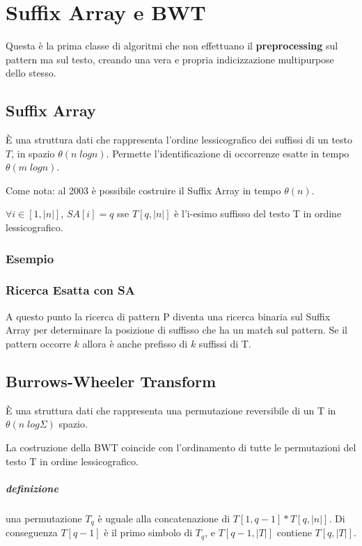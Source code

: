\chapter{Suffix Array e BWT}

Questa \`e la prima classe di algoritmi che non effettuano il \textbf{preprocessing} sul pattern ma sul testo, creando una vera e propria indicizzazione multipurpose dello stesso.

\section{Suffix Array}

\`E una struttura dati che rappresenta l'ordine lessicografico dei suffissi di un testo $T$, in spazio $\theta(n\;logn)$. Permette l'identificazione di occorrenze esatte in tempo $\theta(m\;logn)$.

Come nota: al 2003 \`e possibile costruire il Suffix Array in tempo $\theta(n)$.

$\forall i \in [1, |n|]$, $SA[i] = q$ sse $T[q,|n|]$ \`e l'i-esimo suffisso del testo T in ordine lessicografico.

\subsection{Esempio}


\subsection{Ricerca Esatta con SA}

A questo punto la ricerca di pattern P diventa una ricerca binaria sul Suffix Array per determinare la posizione di suffisso che ha un match sul pattern. Se il pattern occorre $k$ allora \`e anche prefisso di $k$ suffissi di T.

\section{Burrows-Wheeler Transform}

\`E una struttura dati che rappresenta una permutazione reversibile di un T in $\theta(n\;log\Sigma)$ spazio.

La costruzione della BWT coincide con l'ordinamento di tutte le permutazioni del testo T in ordine lessicografico.

\paragraph{definizione} una permutazione $T_q$ \`e uguale alla concatenazione di $T[1,q-1] \ast T[q,|n|]$.
Di conseguenza $T[q-1]$ \`e il primo simbolo di $T_q$, e $T[q-1 ,|T|]$ contiene $T[q, |T|]$.

